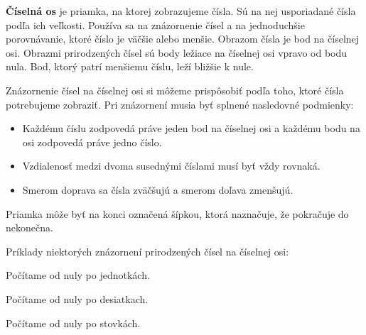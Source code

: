 \documentclass{report}
\begin{document}
\textbf{Číselná os} je priamka, na ktorej zobrazujeme čísla. Sú na nej usporiadané čísla podľa ich veľkosti. Používa sa na znázornenie čísel a na jednoduchšie porovnávanie, ktoré číslo je väčšie alebo menšie. Obrazom čísla je bod na číselnej osi. Obrazmi prirodzených čísel sú body ležiace na číselnej osi vpravo od bodu nula. Bod, ktorý patrí menšiemu číslu, leží bližšie k nule.

Znázornenie čísel na číselnej osi si môžeme prispôsobiť podľa toho, ktoré čísla potrebujeme zobraziť. Pri znázornení musia byť splnené nasledovné podmienky:
\begin{itemize}
  \item Každému číslu zodpovedá práve jeden bod na číselnej osi a každému bodu na osi zodpovedá práve jedno číslo.
  \item Vzdialenosť medzi dvoma susednými číslami musí byť vždy rovnaká.
  \item Smerom doprava sa čísla zväčšujú a smerom doľava zmenšujú.
\end{itemize}
Priamka môže byť na konci označená šípkou, ktorá naznačuje, že pokračuje do nekonečna.

Príklady niektorých znázornení prirodzených čísel na číselnej osi:

\begin{center}
  Počítame od nuly po jednotkách. \vspace{5mm}

\end{center}

\begin{center}
  Počítame od nuly po desiatkach. \vspace{5mm}

\end{center}

\begin{center}
  Počítame od nuly po stovkách. \vspace{5mm}

\end{center}
\end{document}
